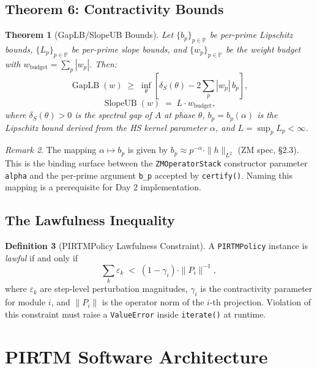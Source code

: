 \documentclass[12pt,letterpaper]{article}
\newtheorem{theorem}{Theorem}[section]
\theoremstyle{definition}
\newtheorem{definition}[theorem]{Definition}
\theoremstyle{remark}
\newtheorem{remark}[theorem]{Remark}
\begin{document}
\subsection{Theorem 6: Contractivity Bounds}

\begin{theorem}[GapLB/SlopeUB Bounds]
\label{thm:gaplb}
Let $\{b_p\}_{p \in \mathbb{P}}$ be per-prime Lipschitz bounds,
$\{L_p\}_{p \in \mathbb{P}}$ be per-prime slope bounds, and
$\{w_p\}_{p \in \mathbb{P}}$ be the weight budget with
$w_{\mathrm{budget}} = \sum_p |w_p|$. Then:
\[
  \operatorname{GapLB}(w) \;\geq\;
  \inf_\theta \!\left[\delta_S(\theta) - 2\sum_p |w_p|\, b_p \right],
\]
\[
  \operatorname{SlopeUB}(w) \;=\; L \cdot w_{\mathrm{budget}},
\]
where $\delta_S(\theta) > 0$ is the spectral gap of $A$ at phase $\theta$,
$b_p = b_p(\alpha)$ is the Lipschitz bound derived from the HS kernel
parameter $\alpha$, and $L = \sup_p L_p < \infty$.
\end{theorem}

\begin{remark}
The mapping $\alpha \mapsto b_p$ is given by
$b_p \approx p^{-\alpha} \cdot \|h\|_{L^2}$
(ZM spec, \S2.3). This is the binding surface between the
\texttt{ZMOperatorStack} constructor parameter \texttt{alpha}
and the per-prime argument \texttt{b\_p} accepted by \texttt{certify()}.
Naming this mapping is a prerequisite for Day 2 implementation.
\end{remark}

\subsection{The Lawfulness Inequality}

\begin{definition}[PIRTMPolicy Lawfulness Constraint]
\label{def:lawfulness}
A \texttt{PIRTMPolicy} instance is \emph{lawful} if and only if
\[
  \sum_{k} \varepsilon_k
  \;<\;
  (1 - \gamma_i) \cdot \|P_i\|^{-1},
\]
where $\varepsilon_k$ are step-level perturbation magnitudes, $\gamma_i$ is
the contractivity parameter for module $i$, and $\|P_i\|$ is the operator
norm of the $i$-th projection. Violation of this constraint must raise a
\texttt{ValueError} inside \texttt{iterate()} at runtime.
\end{definition}

\section{PIRTM Software Architecture}
\label{sec:arch}
\end{document}

